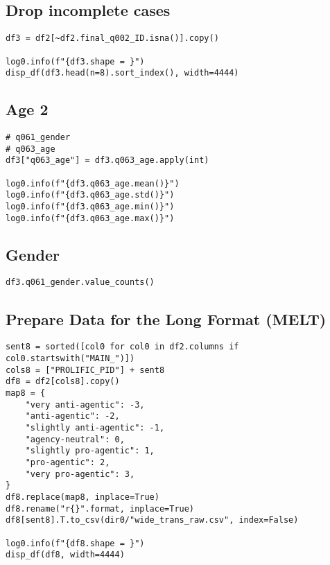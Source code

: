 \documentclass[a4paper,10pt,onecolumn,oneside,openright]{article}
\begin{document}
\subsection{Drop incomplete cases}
\label{sec:org435b89a}
\begin{verbatim}
df3 = df2[~df2.final_q002_ID.isna()].copy()

log0.info(f"{df3.shape = }")
disp_df(df3.head(n=8).sort_index(), width=4444)
\end{verbatim}

\subsection{Age 2}
\label{sec:org94664ec}
\begin{verbatim}
# q061_gender
# q063_age
df3["q063_age"] = df3.q063_age.apply(int)

log0.info(f"{df3.q063_age.mean()}")
log0.info(f"{df3.q063_age.std()}")
log0.info(f"{df3.q063_age.min()}")
log0.info(f"{df3.q063_age.max()}")
\end{verbatim}
\subsection{Gender}
\label{sec:org0fb6de9}
\begin{verbatim}
df3.q061_gender.value_counts()
\end{verbatim}

\subsection{Prepare Data for the Long Format (MELT)}
\label{sec:org825a636}
\begin{verbatim}
sent8 = sorted([col0 for col0 in df2.columns if col0.startswith("MAIN_")])
cols8 = ["PROLIFIC_PID"] + sent8
df8 = df2[cols8].copy()
map8 = {
    "very anti-agentic": -3,
    "anti-agentic": -2,
    "slightly anti-agentic": -1,
    "agency-neutral": 0,
    "slightly pro-agentic": 1,
    "pro-agentic": 2,
    "very pro-agentic": 3,
}
df8.replace(map8, inplace=True)
df8.rename("r{}".format, inplace=True)
df8[sent8].T.to_csv(dir0/"wide_trans_raw.csv", index=False)

log0.info(f"{df8.shape = }")
disp_df(df8, width=4444)
\end{verbatim}
\end{document}
